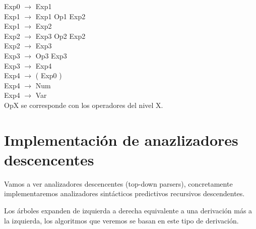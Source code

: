 \documentclass[\main/ApuntesPL.tex]{subfiles}
\begin{document}
\begin{center}
\begin{minipage}{.6\textwidth}
          \hspace*{5mm}Exp0 $\rightarrow$ Exp1 \\
          \hspace*{5mm}Exp1 $\rightarrow$ Exp1 Op1 Exp2 \\
          \hspace*{5mm}Exp1 $\rightarrow$ Exp2 \\
          \hspace*{5mm}Exp2 $\rightarrow$ Exp3 Op2 Exp2 \\
          \hspace*{5mm}Exp2 $\rightarrow$ Exp3 \\
          \hspace*{5mm}Exp3 $\rightarrow$ Op3 Exp3 \\
          \hspace*{5mm}Exp3 $\rightarrow$ Exp4 \\
          \hspace*{5mm}Exp4 $\rightarrow$ ( Exp0 ) \\
          \hspace*{5mm}Exp4 $\rightarrow$ Num \\
          \hspace*{5mm}Exp4 $\rightarrow$ Var \\
          OpX se corresponde con los operadores del nivel X.
        \end{minipage}
      \end{center}

  \newpage
  \section{Implementación de anazlizadores descencentes}
    \par
    Vamos a ver analizadores descencentes (top-down parsers), concretamente implementaremos
    analizadores sintácticos predictivos recursivos descendentes.

    \bigskip
    \par
    Los árboles expanden de izquierda a derecha equivalente a una derivación más a
    la izquierda, los algoritmos que veremos se basan en este tipo de derivación.
\end{document}
